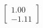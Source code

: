 \documentclass[preview]{standalone}
\begin{document}
\begin{align*}
\begin{bmatrix} 1.00 \\ -1.11 \end{bmatrix}
\end{align*}
\end{document}
